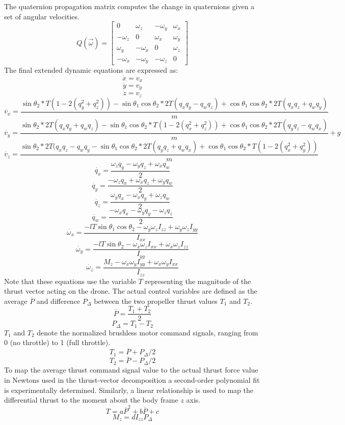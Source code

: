 \documentclass[]{article}
\newcommand{\pdiff}{P_{\Delta}}
\newcommand{\pavg}{\overline{P}}
\begin{document}
The quaternion propagation matrix computes the change in quaternions given a set of angular velocities.
        \[
        Q(\vec{\omega}) =
        \begin{bmatrix}
        0 & \omega_z & -\omega_y & \omega_x \\
        -\omega_z & 0 & \omega_x & \omega_y \\
        \omega_y & -\omega_x & 0 & \omega_z \\
        -\omega_x & -\omega_y & -\omega_z & 0
        \end{bmatrix}
	\]
	The final extended dynamic equations are expressed as:
	\[
		\dot{x} = v_x
	\]
	\[
		\dot{y} = v_y
	\]
	\[
		\dot{z} = v_z
	\]
	\[
		\dot{v_x} = \frac{\sin{\theta_2} *T(1 - 2(q_y^2 + q_z^2))-\sin{\theta_1}\cos{\theta_2}*2T(q_x q_y - q_w q_z)+\cos{\theta_1}\cos{\theta_2}* 2T(q_x q_z + q_w q_y)}{m}
	\]
	\[
		\dot{v_y} =\frac{\sin{\theta_2} *2T(q_x q_y + q_w q_z)-\sin{\theta_1}\cos{\theta_2}*T(1 - 2(q_x^2 + q_z^2))+\cos{\theta_1}\cos{\theta_2}* 2T(q_y q_z - q_w q_x)}{m}+g
	\]
	\[
		\dot{v_z} = \frac{\sin{\theta_2} *2T(q_x q_z - q_w q_y-\sin{\theta_1}\cos{\theta_2}* 2T(q_y q_z + q_w q_x)+\cos{\theta_1}\cos{\theta_2}* T(1 - 2(q_x^2 + q_y^2))}{m}
	\]
	\[
		\dot{q_x} = \frac{\omega_z q_y-\omega_y q_z+ \omega_x q_w}{2}
	\]
	\[
		\dot{q_y} = \frac{-\omega_z q_x+\omega_x q_z+ \omega_y q_w}{2}
	\]
	\[
		\dot{q_z} =  \frac{\omega_y q_x-\omega_x q_y+ \omega_z q_w}{2}
	\]
	\[
		\dot{q_w} =  \frac{-\omega_x q_x - \omega_y q_y - \omega_z q_z}{2}
	\]
	\[
		\dot{\omega_x} = \frac{-lT\sin{\theta_1}\cos{\theta_2}-\omega_y\omega_zI_{zz} + \omega_y\omega_zI_{yy}}{I_{xx}}
	\]
	\[
		\dot{\omega_y} = \frac{-lT\sin{\theta_2}-\omega_x\omega_zI_{xx} + \omega_x\omega_zI_{zz}}{I_{yy}}
	\]
	\[
		\dot{\omega_z} =  \frac{M_z -\omega_x\omega_yI_{yy} + \omega_x\omega_yI_{xx}}{I_{zz}}
	\]
Note that these equations use the variable $T$ representing the magnitude of the thrust vector acting on the drone. 
The actual control variables are defined as the average $\pavg$ and difference $\pdiff$ between the two propeller thrust values $T_1$ and $T_2$. 
	\[
		\pavg =\frac{T_1+T_2}{2}
	\]
	\[
		\pdiff =T_1-T_2
	\]
$T_1$ and $T_2$ denote the normalized brushless motor command signals, ranging from 0 (no throttle) to 1 (full throttle).
	\[
		T_1 = \pavg + \pdiff/2
	\]
	\[
		T_2 = \pavg - \pdiff/2
	\]
To map the average thrust command signal value to the actual thrust force value in Newtons used in the thrust-vector decomposition a second-order polynomial fit is experimentally determined. Similarly, a linear relationship is used to map the differential thrust to the moment about the body frame $z$ axis.
	\[
		T = a\pavg^2+b\pavg+c
	\]
	\[
		M_z = d I_{zz} \pdiff
	\]
\end{document}
